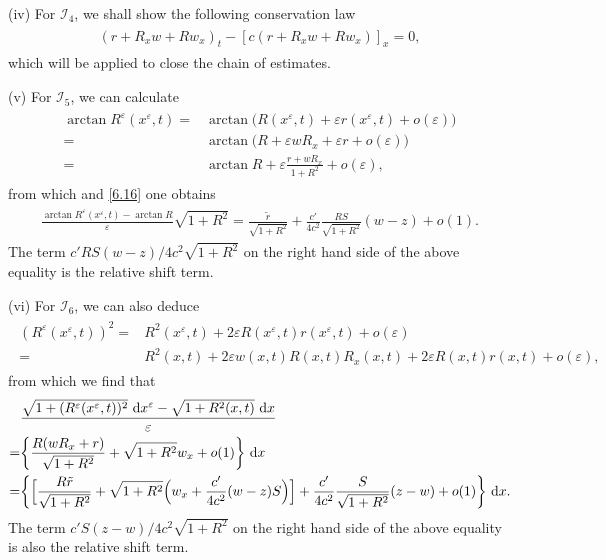 \documentclass[11pt,reqno]{article}
\newcommand{\eps}{\varepsilon}
\newcommand{\fr}{\frac}
\numberwithin{equation}{section}
\begin{document}
(iv) For $\mathcal{I}_4$, we shall show the following conservation law
\begin{align}\label{6.21}
\begin{split}
(r+R_x w+Rw_x)_t-[c(r+R_x w+Rw_x)]_x=0,
\end{split}
\end{align}
which will be applied to close the chain of estimates.

(v) For $\mathcal{I}_5$, we can calculate
\begin{align*}
\begin{split}
\arctan R^\eps(x^\eps, t)=&\arctan\Big(R(x^\eps, t) +\eps r(x^\eps, t)+o(\eps)\Big) \\
=&\arctan\Big(R +\eps wR_x +\eps r+o(\eps)\Big)
 \\
=&\arctan R +\eps \fr{r+wR_x}{1+R^2} +o(\eps),
\end{split}
\end{align*}
from which and \eqref{6.16} one obtains
\begin{align*}
\begin{split}
\fr{\arctan R^\eps(x^\eps, t)-\arctan R}{\eps}\sqrt{1+R^2}= \fr{\tilde{r}}{\sqrt{1+R^2}} +\fr{c'}{4c^2}\fr{RS}{\sqrt{1+R^2}}(w-z) +o(1).
\end{split}
\end{align*}
The term $c'RS(w-z)/4c^2\sqrt{1+R^2}$ on the right hand side of the above equality is the relative shift term.

(vi) For $\mathcal{I}_6$, we can also deduce
\begin{align*}
\begin{split}
(R^\eps(x^\eps,t))^2=&R^2(x^\eps,t) +2\eps R(x^\eps,t)r(x^\eps, t)+o(\eps) \\
=& R^2(x,t) +2\eps w(x,t)R(x,t)R_x(x,t)+2\eps R(x,t)r(x,t)+o(\eps),
\end{split}
\end{align*}
from which we find that
\begin{align*}
\begin{split}
&\fr{\sqrt{1+(R^\eps(x^\eps,t))^2}\ {\rm d}x^\eps -\sqrt{1+R^2(x,t)}\ {\rm d}x}{\eps} \\
=& \bigg\{\fr{R(wR_x+r)}{\sqrt{1+R^2}} +\sqrt{1+R^2}w_x +o(1)\bigg\}\ {\rm d}x \\
=& \bigg\{\Big[\fr{R\tilde{r}}{\sqrt{1+R^2}} +\sqrt{1+R^2}\Big(w_x+\fr{c'}{4c^2}(w-z)S \Big)\Big]+ \fr{c'}{4c^2}\fr{S}{\sqrt{1+R^2}}(z-w)+o(1)\bigg\}\ {\rm d}x.
\end{split}
\end{align*}
The term $c'S(z-w)/4c^2\sqrt{1+R^2}$ on the right hand side of the above equality is also the relative shift term.
\end{document}
